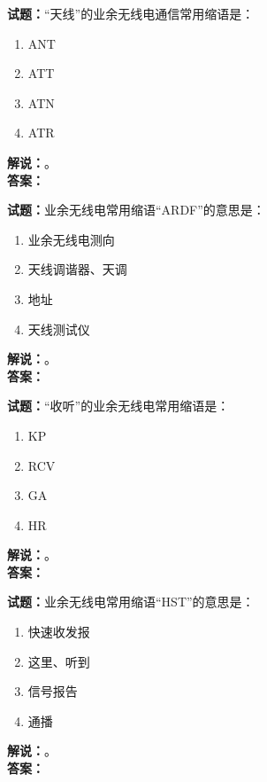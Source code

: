 \documentclass{ctexbook}
\begin{document}
\bigskip




\noindent\textbf{试题：}“天线”的业余无线电通信常用缩语是：
\begin{enumerate}[leftmargin=3em]
\item ANT
\item ATT
\item ATN
\item ATR
\end{enumerate}
\noindent\textbf{解说：}\textbf{}。\\\noindent\textbf{答案：}

\bigskip




\noindent\textbf{试题：}业余无线电常用缩语“ARDF”的意思是：
\begin{enumerate}[leftmargin=3em]
\item 业余无线电测向
\item 天线调谐器、天调
\item 地址
\item 天线测试仪
\end{enumerate}
\noindent\textbf{解说：}\textbf{}。\\\noindent\textbf{答案：}

\bigskip




\noindent\textbf{试题：}“收听”的业余无线电常用缩语是：
\begin{enumerate}[leftmargin=3em]
\item KP
\item RCV
\item GA
\item HR
\end{enumerate}
\noindent\textbf{解说：}\textbf{}。\\\noindent\textbf{答案：}

\bigskip




\noindent\textbf{试题：}业余无线电常用缩语“HST”的意思是：
\begin{enumerate}[leftmargin=3em]
\item 快速收发报
\item 这里、听到
\item 信号报告
\item 通播
\end{enumerate}
\noindent\textbf{解说：}\textbf{}。\\\noindent\textbf{答案：}

\bigskip
\end{document}
